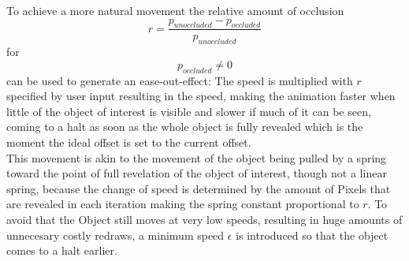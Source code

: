 To achieve a more natural movement the relative amount of occlusion
\begin{equation}
	\label{eq:OcclusionRatio}
	r =\frac{p_{unoccluded} - p_{occluded}}{ p_{unoccluded}}
\end{equation}
for
\begin{equation}
	p_{occluded} \neq 0
\end{equation}
can be used to generate an ease-out-effect:
The speed is multiplied with $r$  specified by user input resulting in the speed, making the animation faster when little of the object of interest is visible and slower if much of it can be seen, coming to a halt as soon as the whole object is fully revealed which is the moment the ideal offset is set to the current offset.\\
This movement is akin to the movement of the object being pulled by a spring toward the point of full revelation of the object of interest, though not a linear spring, because the change of speed is determined by the amount of Pixels that are revealed in each iteration making the spring constant proportional to $r$.
To avoid that the Object still moves at very low speeds, resulting in huge amounts of unnecesary costly redraws, a minimum speed $\epsilon$ is introduced so that the object comes to a halt earlier.\\
